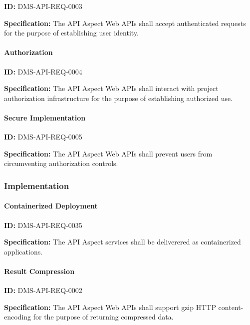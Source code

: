 \documentclass[SE,toc,lsstdraft]{lsstdoc}
\begin{document}
\label{DMS-API-REQ-0003}
\textbf{ID:} DMS-API-REQ-0003

\textbf{Specification:}
The API Aspect Web APIs shall accept authenticated requests for the purpose of establishing user identity.

\paragraph{Authorization}\hfill  %

\label{DMS-API-REQ-0004}
\textbf{ID:} DMS-API-REQ-0004

\textbf{Specification:}
The API Aspect Web APIs shall interact with project authorization infrastructure for the purpose of establishing authorized use.

\paragraph{Secure Implementation}\hfill  %

\label{DMS-API-REQ-0005}
\textbf{ID:} DMS-API-REQ-0005

\textbf{Specification:}
The API Aspect Web APIs shall prevent users from circumventing authorization controls.

\subsubsection{Implementation}

\paragraph{Containerized Deployment}\hfill  %

\label{DMS-API-REQ-0035}
\textbf{ID:} DMS-API-REQ-0035

\textbf{Specification:}
The API Aspect services shall be deliverered as containerized applications.

\paragraph{Result Compression}\hfill  %

\label{DMS-API-REQ-0002}
\textbf{ID:} DMS-API-REQ-0002

\textbf{Specification:}
The API Aspect Web APIs shall support gzip HTTP content-encoding for the purpose of returning compressed data.
\end{document}
